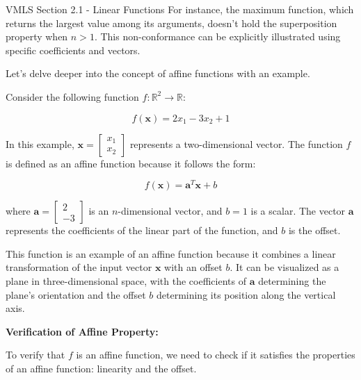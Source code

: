 \begin{notes}{VMLS Section 2.1 - Linear Functions}
    For instance, the maximum function, which returns the largest value among its arguments, doesn't hold the superposition property when \( n > 1 \). This non-conformance can be explicitly illustrated using specific coefficients and 
    vectors.
    
    \begin{Highlight}
        Let's delve deeper into the concept of affine functions with an example. \vspace*{1em}

        
        Consider the following function \( f: \mathbb{R}^2 \rightarrow \mathbb{R} \):
        
        \[
        f(\mathbf{x}) = 2x_1 - 3x_2 + 1
        \]
        
        In this example, \( \mathbf{x} = \begin{bmatrix} x_1 \\ x_2 \end{bmatrix} \) represents a two-dimensional vector. The function \( f \) is defined as an affine function because it follows the form:
        
        \[
        f(\mathbf{x}) = \mathbf{a}^T \mathbf{x} + b
        \]
        
        where \( \mathbf{a} = \begin{bmatrix} 2 \\ -3 \end{bmatrix} \) is an \( n \)-dimensional vector, and \( b = 1 \) is a scalar. The vector \( \mathbf{a} \) represents the coefficients of the linear part of the function, and 
        \( b \) is the offset.
        
        This function is an example of an affine function because it combines a linear transformation of the input vector \( \mathbf{x} \) with an offset \( b \). It can be visualized as a plane in three-dimensional space, with the 
        coefficients of \( \mathbf{a} \) determining the plane's orientation and the offset \( b \) determining its position along the vertical axis.
        
        \vspace*{1em} \textbf{Verification of Affine Property:} \vspace*{1em}
        
        To verify that \( f \) is an affine function, we need to check if it satisfies the properties of an affine function: linearity and the offset.
        

\end{Highlight}
\end{notes}
